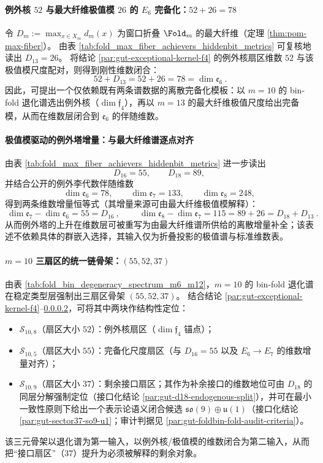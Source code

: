 \paragraph{例外核 \texorpdfstring{$52$}{52} 与最大纤维极值模 \texorpdfstring{$26$}{26} 的 \texorpdfstring{$E_6$}{E6} 完备化：\texorpdfstring{$52+26=78$}{52+26=78}}\label{par:gut-e6-completion-52-26}
令 \(D_m:=\max_{x\in X_m} d_m(x)\) 为窗口折叠 \(\Fold_m\) 的最大纤维（定理 \ref{thm:pom-max-fiber}）。
由表 \ref{tab:fold_max_fiber_achievers_hiddenbit_metrics} 可复核地读出
\(
D_{13}=26
\)。
将结论 \ref{par:gut-exceptional-kernel-f4} 的例外核扇区维数 \(52\) 与该极值模尺度配对，则得到刚性维数闭合：
\[
\boxed{\ 52+D_{13}=52+26=78=\dim\mathfrak{e}_6\ }.
\]
因此，可提出一个仅依赖既有两条谱数据的离散完备化模板：以 \(m=10\) 的 bin-fold 退化谱选出例外核（\(\dim\mathfrak{f}_4\)），再以 \(m=13\) 的最大纤维极值尺度给出完备模，从而在维数层闭合到 \(\mathfrak{e}_6\) 的伴随维数。

\paragraph{极值模驱动的例外塔增量：与最大纤维谱逐点对齐}\label{par:gut-maxfiber-exceptional-tower}
由表 \ref{tab:fold_max_fiber_achievers_hiddenbit_metrics} 进一步读出
\[
D_{16}=55,\qquad D_{18}=89,
\]
并结合公开的例外李代数伴随维数
\[
\dim\mathfrak{e}_6=78,\qquad \dim\mathfrak{e}_7=133,\qquad \dim\mathfrak{e}_8=248,
\]
得到两条维数增量恒等式（其增量来源可由最大纤维极值模解释）：
\[
\boxed{\ \dim\mathfrak{e}_7-\dim\mathfrak{e}_6=55=D_{16}\ },
\qquad
\boxed{\ \dim\mathfrak{e}_8-\dim\mathfrak{e}_7=115=89+26=D_{18}+D_{13}\ }.
\]
从而例外塔的上升在维数层可被重写为由最大纤维谱所供给的离散增量补全；该表述不依赖具体的群嵌入选择，其输入仅为折叠投影的极值谱与标准维数表。

\paragraph{\(m=10\) 三扇区的统一链骨架：\texorpdfstring{$(55,52,37)$}{(55,52,37)}}\label{par:gut-trisector-55-52-37}
由表 \ref{tab:fold_bin_degeneracy_spectrum_m6_m12}，\(m=10\) 的 bin-fold 退化谱在稳定类型层强制出三扇区骨架 \((55,52,37)\)。
结合结论 \ref{par:gut-exceptional-kernel-f4}--\ref{par:gut-maxfiber-exceptional-tower}，可将其中两块作结构性定位：
\begin{itemize}
  \item \(\mathcal{S}_{10,8}\)（扇区大小 \(52\)）：例外核扇区（\(\dim\mathfrak{f}_4\) 锚点）；
  \item \(\mathcal{S}_{10,5}\)（扇区大小 \(55\)）：完备化尺度扇区（与 \(D_{16}=55\) 以及 \(E_6\to E_7\) 的维数增量对齐）；
  \item \(\mathcal{S}_{10,9}\)（扇区大小 \(37\)）：剩余接口扇区；其作为补余接口的维数地位可由 \(D_{18}\) 的同层分解强制定位（接口化结论 \ref{par:gut-d18-endogenous-split}），并可在最小一致性原则下给出一个表示论语义闭合候选 \(\mathfrak{so}(9)\oplus\mathfrak{u}(1)\)（接口化结论 \ref{par:gut-sector37-so9-u1}；审计判据见 \ref{par:gut-foldbin-fold-audit-criteria}）。
\end{itemize}
该三元骨架以退化谱为第一输入，以例外核/极值模的维数闭合为第二输入，从而把“接口扇区”（\(37\)）提升为必须被解释的剩余对象。

